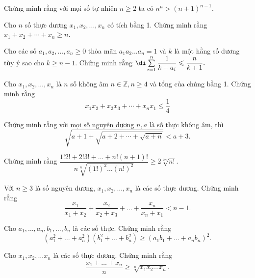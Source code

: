 \begin{bai}
Chứng minh rằng với mọi số tự nhiên $n\ge 2$ ta có $n^n>\left(n+1\right)^{n-1}$.
\end{bai}
\begin{bai}
Cho $ n$ số thực dương $x_1,x_2,...,x_n$ có tích bằng 1. Chứng minh rằng $x_1+x_2+\cdots+x_n\ge n$.
\end{bai}
\begin{bai}
Cho các số $a_1,a_2,...,a_n \ge 0$ thỏa mãn $a_1a_2...a_n=1$ và $k$ là một hằng số dương tùy ý sao cho $k \ge n-1$. Chứng minh rằng $\di\sum\limits_{i = 1}^n {\dfrac{1}{{k + {a_i}}}}  \leqslant \dfrac{n}{{k + 1}}.$
\end{bai}
\begin{bai}
Cho $x_1, x_2, ..., x_n$ là $n$ số
	không âm $n\in \mathbb{Z}, n\ge 4$ và tổng của chúng bằng 1. Chứng minh rằng $${x_1}{x_2} + {x_2}{x_3} + \cdots + {x_n}{x_1} \leqslant \dfrac{1}{4}$$
\end{bai}
\begin{bai}
Chứng minh rằng với mọi số nguyên dương $n, a$ là số thực không âm, thì 
	$$\sqrt {a + 1 + \sqrt {a + 2 + \cdots + \sqrt {a + n} } }  < a + 3.$$
\end{bai}
\begin{bai}
Chứng minh rằng $\displaystyle{\dfrac{1 ! 2 !+2 ! 3 !+\ldots+n !(n+1) !}{n \sqrt[n]{(1 !)^{2} \ldots(n !)^{2}}} \geqslant 2 \sqrt[2 n]{n !}}$.
\end{bai}

\begin{bai}
Với $n \geq 3$ là số nguyên dương, $x_{1}, x_{2}, \ldots, x_{n}$ là các số thực dương. Chứng minh rằng
$$
\dfrac{x_{1}}{x_{1}+x_{2}}+\dfrac{x_{2}}{x_{2}+x_{3}}+\ldots+\dfrac{x_{n}}{x_{n}+x_{1}}<n-1.
$$
\end{bai}

\begin{bai}
Cho $a_{1}, \ldots, a_{n}, b_{1}, \ldots, b_{n}$ là các số thực. Chứng minh rằng
$$
\left(a_{1}^{2}+\ldots+a_{n}^{2}\right)\left(b_{1}^{2}+\ldots+b_{n}^{2}\right) \geq\left(a_{1} b_{1}+\ldots+a_{n} b_{n}\right)^{2}.
$$
\end{bai}
\begin{bai}
Cho $x_{1}, x_{2}, \ldots x_{n}$ là các số thực dương. Chứng minh rằng
$$
\dfrac{x_{1}+\ldots+x_{n}}{n} \geq \sqrt[n]{x_{1} x_{2} \ldots x_{n}}.
$$
\end{bai}
